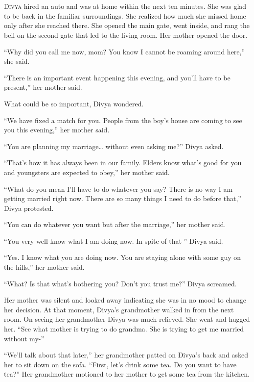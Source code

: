 \chapter{}

\lettrine{D}{ivya} hired an auto and was at home within the next ten minutes. She was glad to
be back in the familiar surroundings. She realized how much she missed home only
after she reached there. She opened the main gate, went inside, and rang the
bell on the second gate that led to the living room. Her mother opened the door.

“Why did you call me now, mom? You know I cannot be roaming around here,” she
said.

“There is an important event happening this evening, and you'll have to be
present,” her mother said.

What could be so important, Divya wondered.

“We have fixed a match for you. People from the boy's house are coming to see
you this evening,” her mother said.

“You are planning my marriage… without even asking me?” Divya asked.

“That's how it has always been in our family. Elders know what's good for you
and youngsters are expected to obey,” her mother said.

“What do you mean I'll have to do whatever you say? There is no way I am getting
married right now. There are so many things I need to do before that,” Divya
protested.

“You can do whatever you want but after the marriage,” her mother said.

“You very well know what I am doing now. In spite of that-” Divya said.

“Yes. I know what you are doing now. You are staying alone with some guy on the
hills,” her mother said.

“What? Is that what's bothering you? Don't you trust me?” Divya screamed.

Her mother was silent and looked away indicating she was in no mood to change
her decision. At that moment, Divya's grandmother walked in from the next room.
On seeing her grandmother Divya was much relieved. She went and hugged her. “See
what mother is trying to do grandma. She is trying to get me married without
my-”

“We'll talk about that later,” her grandmother patted on Divya's back and asked
her to sit down on the sofa. “First, let's drink some tea. Do you want to have
tea?” Her grandmother motioned to her mother to get some tea from the kitchen.

